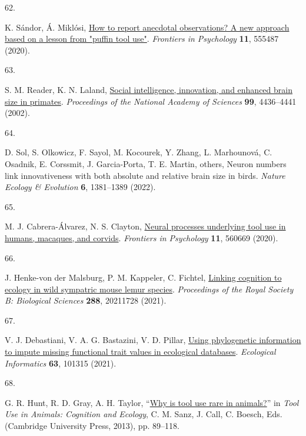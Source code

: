 \documentclass[
  man,floatsintext]{apa6}
\newlength{\cslhangindent}
\newlength{\csllabelwidth}
\newlength{\cslentryspacingunit} %
\newenvironment{CSLReferences}[2] %
 {%
  \setlength{\parindent}{0pt}
  \ifodd #1
  \let\oldpar\par
  \def\par{\hangindent=\cslhangindent\oldpar}
  \fi
  \setlength{\parskip}{#2\cslentryspacingunit}
 }%
 {}
\newcommand{\CSLLeftMargin}[1]{\parbox[t]{\csllabelwidth}{#1}}
\newcommand{\CSLRightInline}[1]{\parbox[t]{\linewidth - \csllabelwidth}{#1}\break}
\begin{document}
\begin{CSLReferences}{0}{0}
\leavevmode{}%
\CSLLeftMargin{62. }%
\CSLRightInline{K. Sándor, Á. Miklósi, \href{https://doi.org/10.3389/fpsyg.2020.555487}{How to report anecdotal observations? A new approach based on a lesson from "puffin tool use"}. \emph{Frontiers in Psychology} \textbf{11}, 555487 (2020).}

\leavevmode{}%
\CSLLeftMargin{63. }%
\CSLRightInline{S. M. Reader, K. N. Laland, \href{https://doi.org/10.1073/pnas.062041299}{Social intelligence, innovation, and enhanced brain size in primates}. \emph{Proceedings of the National Academy of Sciences} \textbf{99}, 4436--4441 (2002).}

\leavevmode{}%
\CSLLeftMargin{64. }%
\CSLRightInline{D. Sol, S. Olkowicz, F. Sayol, M. Kocourek, Y. Zhang, L. Marhounová, C. Osadnik, E. Corssmit, J. Garcia-Porta, T. E. Martin, others, Neuron numbers link innovativeness with both absolute and relative brain size in birds. \emph{Nature Ecology \& Evolution} \textbf{6}, 1381--1389 (2022).}

\leavevmode{}%
\CSLLeftMargin{65. }%
\CSLRightInline{M. J. Cabrera-Álvarez, N. S. Clayton, \href{https://doi.org/10.3389/fpsyg.2020.560669}{Neural processes underlying tool use in humans, macaques, and corvids}. \emph{Frontiers in Psychology} \textbf{11}, 560669 (2020).}

\leavevmode{}%
\CSLLeftMargin{66. }%
\CSLRightInline{J. Henke-von der Malsburg, P. M. Kappeler, C. Fichtel, \href{https://doi.org/10.1098/rspb.2021.1728}{Linking cognition to ecology in wild sympatric mouse lemur species}. \emph{Proceedings of the Royal Society B: Biological Sciences} \textbf{288}, 20211728 (2021).}

\leavevmode{}%
\CSLLeftMargin{67. }%
\CSLRightInline{V. J. Debastiani, V. A. G. Bastazini, V. D. Pillar, \href{https://doi.org/10.1016/j.ecoinf.2021.101315}{Using phylogenetic information to impute missing functional trait values in ecological databases}. \emph{Ecological Informatics} \textbf{63}, 101315 (2021).}

\leavevmode{}%
\CSLLeftMargin{68. }%
\CSLRightInline{G. R. Hunt, R. D. Gray, A. H. Taylor, {``\href{https://doi.org/10.1017/CBO9780511894800.007}{Why is tool use rare in animals?}''} in \emph{Tool Use in Animals: Cognition and Ecology}, C. M. Sanz, J. Call, C. Boesch, Eds. (Cambridge University Press, 2013), pp. 89--118.}


\end{CSLReferences}
\end{document}
